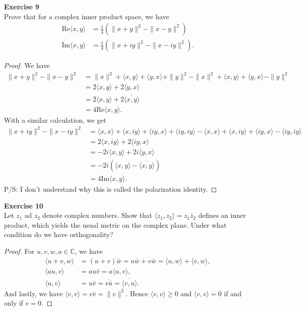 \documentclass[12pt, a4paper]{article}
\theoremstyle{plain}
\newcommand{\C}{\mathbb{C}}
\newenvironment{exercise}[2][Exercise]
    { \begin{mdframed}[backgroundcolor=gray!20] \textbf{#1 #2} \\}
    {  \end{mdframed}}
\begin{document}
\begin{exercise}{9}
Prove that for a complex inner product space, we have
\begin{align*}
\text{Re}\langle{x,y}\rangle &= \frac{1}{4}(\|x+y\|^2-\|x-y\|^2)\\
\text{Im}\langle{x,y}\rangle &= \frac{1}{4}(\|x+iy\|^2-\|x-iy\|^2).
\end{align*}
\end{exercise}
	\begin{proof}
	We have 
	\begin{align*}
	\|x+y\|^2 - \|x-y\|^2 &= \|x\|^2 + \langle{x,y}\rangle + \langle{y,x}\rangle + \|y\|^2 -\|x\|^2 +\langle{x,y}\rangle +\langle{y,x}\rangle -\|y\|^2\\
	&= 2\langle{x,y}\rangle + 2\langle{y,x}\rangle\\
	&= 2\langle{x,y}\rangle + 2 \overline{\langle{x,y}\rangle}\\
	&= 4\text{Re}\langle{x,y}\rangle.
	\end{align*}
	With a similar calculation, we get
	\begin{align*}
	\|x+iy\|^2 - \|x-iy\|^2 &= \langle{x,x}\rangle +\langle{x,iy}\rangle +\langle{iy,x}\rangle +\langle{iy,iy}\rangle -\langle{x,x}\rangle +\langle{x,iy}\rangle +\langle{iy,x}\rangle -\langle{iy,iy}\rangle\\
	&= 2\langle{x,iy}\rangle + 2\langle{iy,x}\rangle\\
	&= -2i\langle{x,y}\rangle + 2i\langle{y,x}\rangle\\
	&= -2i(\langle{x,y}\rangle - \overline{\langle{x,y}\rangle})\\
	&= 4\text{Im}\langle{x,y}\rangle.
	\end{align*}
	P/S: I don't understand why this is called the polarization identity.
	\end{proof}
	

\begin{exercise}{10}
Let $z_1$ ad $z_2$ denote complex numbers. Show that $\langle{z_1,z_2}\rangle = z_1\bar z_2$ defines an inner product, which yields the usual metric on the complex plane. Under what condition do we have orthogonality?
\end{exercise}
	\begin{proof}
	For $u,v,w,a\in \C$, we have
	\begin{align*}
	\langle{u+v,w}\rangle &= (u+v)\bar w = u\bar w+v\bar w = \langle{u,w}\rangle + \langle{v,w}\rangle,\\
	\langle{au,v}\rangle &= au\bar v = a\langle{u,v}\rangle,\\
	\langle{u,v}\rangle &= u\bar v = \overline{v\bar u} = \overline{\langle{v,u}\rangle}.
	\end{align*}
	And lastly, we have 	$\langle{v,v}\rangle = v\bar v = \|v\|^2$. Hence $\langle{v,v}\rangle \geq 0$ and $\langle{v,v}\rangle = 0$ if and only if $v=0$.
	\end{proof}
\end{document}
